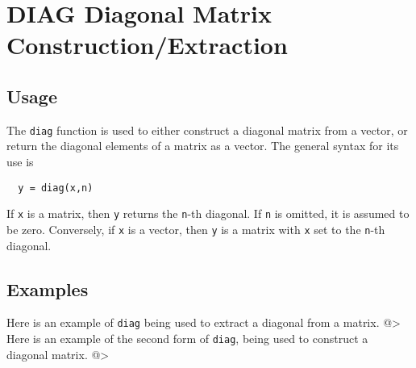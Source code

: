 \section{DIAG Diagonal Matrix Construction/Extraction}

\subsection{Usage}

The \verb|diag| function is used to either construct a 
diagonal matrix from a vector, or return the diagonal
elements of a matrix as a vector.  The general syntax
for its use is
\begin{verbatim}
  y = diag(x,n)
\end{verbatim}
If \verb|x| is a matrix, then \verb|y| returns the \verb|n|-th 
diagonal.  If \verb|n| is omitted, it is assumed to be
zero.  Conversely, if \verb|x| is a vector, then \verb|y|
is a matrix with \verb|x| set to the \verb|n|-th diagonal.
\subsection{Examples}

Here is an example of \verb|diag| being used to extract
a diagonal from a matrix.
@>
Here is an example of the second form of \verb|diag|, being
used to construct a diagonal matrix.
@>
